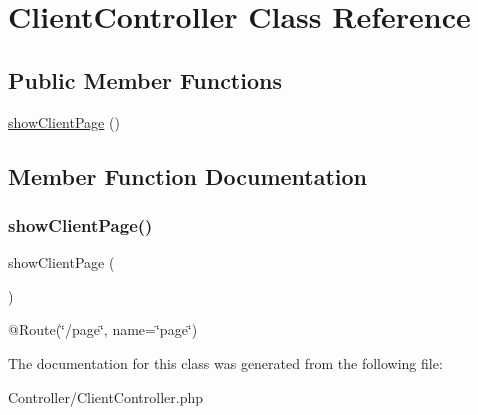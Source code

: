 \hypertarget{class_app_1_1_controller_1_1_client_controller}{}\section{Client\+Controller Class Reference}
\label{class_app_1_1_controller_1_1_client_controller}
\subsection*{Public Member Functions}
\begin{DoxyCompactItemize}
\item 
\mbox{\hyperlink{class_app_1_1_controller_1_1_client_controller_a1ebef896e1abdc056a740465bd2732cf}{show\+Client\+Page}} ()
\end{DoxyCompactItemize}


\subsection{Member Function Documentation}
\mbox{\label{class_app_1_1_controller_1_1_client_controller_a1ebef896e1abdc056a740465bd2732cf}} 
\subsubsection{\texorpdfstring{showClientPage()}{showClientPage()}}
{\footnotesize\ttfamily show\+Client\+Page (\begin{DoxyParamCaption}{ }\end{DoxyParamCaption})}

@\+Route(\char`\"{}/page\char`\"{}, name=\char`\"{}page\char`\"{}) 

The documentation for this class was generated from the following file\+:\begin{DoxyCompactItemize}
\item 
Controller/Client\+Controller.\+php\end{DoxyCompactItemize}
